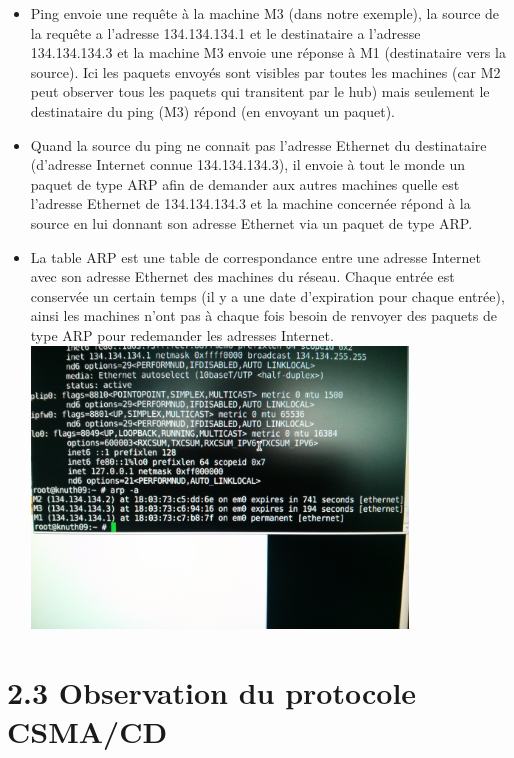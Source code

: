 \documentclass{report}
\begin{document}
\begin{itemize}\renewcommand{\labelitemi}{$\bullet$}
\item Ping envoie une requête à la machine M3 (dans notre exemple), la source de la requête a l'adresse 134.134.134.1 et le destinataire a l'adresse \\134.134.134.3 et la machine M3 envoie une réponse à M1 (destinataire vers la source).
Ici les paquets envoyés sont visibles par toutes les machines (car M2 peut observer tous les paquets qui transitent par le hub) mais seulement le destinataire du ping (M3) répond (en envoyant un paquet).

\item Quand la source du ping ne connait pas l'adresse Ethernet du destinataire (d'adresse Internet connue 134.134.134.3), il envoie à tout le monde un paquet de type ARP afin de demander aux autres machines quelle est l'adresse Ethernet de 134.134.134.3 et la machine concernée répond à la source en lui donnant son adresse Ethernet via un paquet de type ARP.

\item La table ARP est une table de correspondance entre une adresse Internet avec son adresse Ethernet des machines du réseau. Chaque entrée est conservée un certain temps (il y a une date d'expiration pour chaque entrée), ainsi les machines n'ont pas à chaque fois besoin de renvoyer des paquets de type ARP pour redemander les adresses Internet.\\

\includegraphics[width=10cm]{screen7.jpg}

\end{itemize}

\section*{2.3	Observation du protocole CSMA/CD}
\end{document}
